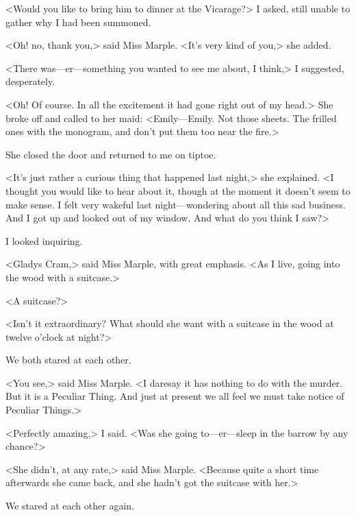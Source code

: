 <Would you like to bring him to dinner at the Vicarage?> I asked, still unable to gather why I had been summoned.

<Oh! no, thank you,> said Miss Marple. <It's very kind of you,> she added.

<There was—er—something you wanted to see me about, I think,> I suggested, desperately.

<Oh! Of course. In all the excitement it had gone right out of my head.> She broke off and called to her maid: <Emily—Emily. Not those sheets. The frilled ones with the monogram, and don't put them too near the fire.>

She closed the door and returned to me on tiptoe.

<It's just rather a curious thing that happened last night,> she explained. <I thought you would like to hear about it, though at the moment it doesn't seem to make sense. I felt very wakeful last night—wondering about all this sad business. And I got up and looked out of my window. And what do you think I saw?>

I looked inquiring.

<Gladys Cram,> said Miss Marple, with great emphasis. <As I live, going into the wood with a suitcase.>

<A suitcase?>

<Isn't it extraordinary? What should she want with a suitcase in the wood at twelve o'clock at night?>

We both stared at each other.

<You see,> said Miss Marple. <I daresay it has nothing to do with the murder. But it is a Peculiar Thing. And just at present we all feel we must take notice of Peculiar Things.>

<Perfectly amazing,> I said. <Was she going to—er—sleep in the barrow by any chance?>

<She didn't, at any rate,> said Miss Marple. <Because quite a short time afterwards she came back, and she hadn't got the suitcase with her.>

We stared at each other again.